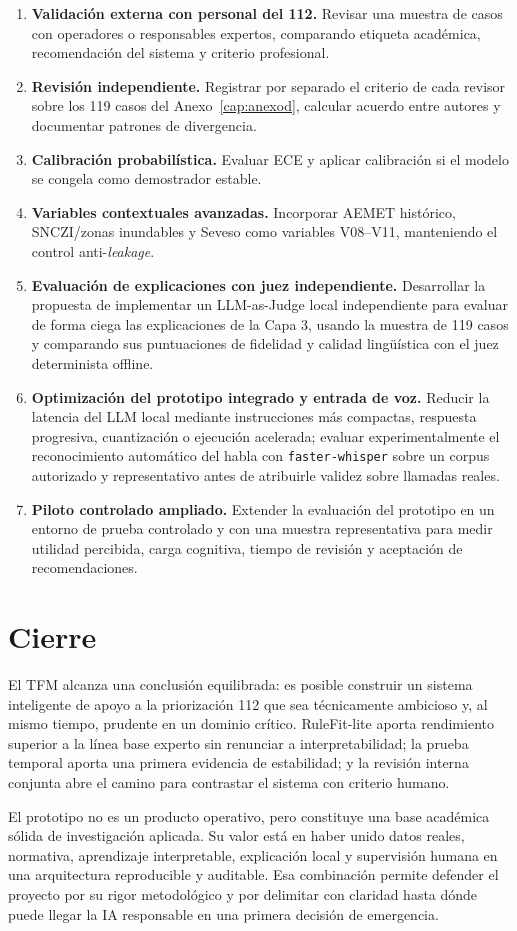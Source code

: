 \begin{enumerate}
    \item \textbf{Validación externa con personal del 112.} Revisar una muestra de
    casos con operadores o responsables expertos, comparando etiqueta académica,
    recomendación del sistema y criterio profesional.
    \item \textbf{Revisión independiente.} Registrar por separado el criterio de cada
    revisor sobre los 119 casos del Anexo~\ref{cap:anexod}, calcular acuerdo entre autores
    y documentar patrones de divergencia.
    \item \textbf{Calibración probabilística.} Evaluar ECE y aplicar calibración si el
    modelo se congela como demostrador estable.
    \item \textbf{Variables contextuales avanzadas.} Incorporar AEMET histórico,
    SNCZI/zonas inundables y Seveso como variables V08--V11, manteniendo el control
    anti-\textit{leakage}.
    \item \textbf{Evaluación de explicaciones con juez independiente.} Desarrollar la
    propuesta de implementar un LLM-as-Judge local independiente para evaluar de forma
    ciega las explicaciones de la Capa 3, usando la muestra de 119 casos
    y comparando sus puntuaciones de fidelidad y calidad lingüística con el juez
    determinista offline.
    \item \textbf{Optimización del prototipo integrado y entrada de voz.} Reducir la latencia del LLM local mediante instrucciones más compactas, respuesta progresiva, cuantización o ejecución acelerada; evaluar experimentalmente el reconocimiento automático del habla con \texttt{faster-whisper} sobre un corpus autorizado y representativo antes de atribuirle validez sobre llamadas reales.
    \item \textbf{Piloto controlado ampliado.} Extender la evaluación del prototipo en
    un entorno de prueba controlado y con una muestra representativa para medir utilidad
    percibida, carga cognitiva, tiempo de revisión y aceptación de recomendaciones.
\end{enumerate}

\section{Cierre}

El TFM alcanza una conclusión equilibrada: es posible construir un sistema inteligente
de apoyo a la priorización 112 que sea técnicamente ambicioso y, al mismo tiempo,
prudente en un dominio crítico. RuleFit-lite aporta rendimiento superior a la línea base
experto sin renunciar a interpretabilidad; la prueba temporal aporta una primera evidencia
de estabilidad; y la revisión interna conjunta abre el camino para contrastar el sistema con
criterio humano.

El prototipo no es un producto operativo, pero constituye una base académica sólida de investigación
aplicada. Su valor está en haber unido datos reales, normativa, aprendizaje
interpretable, explicación local y supervisión humana en una arquitectura reproducible y
auditable. Esa combinación permite defender el proyecto por su rigor metodológico y por
delimitar con claridad hasta dónde puede llegar la IA responsable en una primera
decisión de emergencia.
